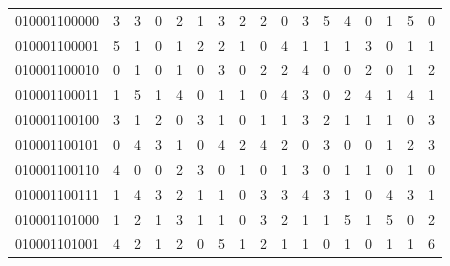 \documentclass[10pt,a4paper]{article}
\begin{document}
\begin{longtable}{ |c|c|c|c|c|c|c|c|c|c|c|c|c|c|c|c|c| }
    010001100000              & 3                            & 3                                & 0                            & 2                              & 1   & 3   & 2   & 2   & 0   & 3   & 5   & 4   & 0   & 1   & 5   & 0   \\
    010001100001              & 5                            & 1                                & 0                            & 1                              & 2   & 2   & 1   & 0   & 4   & 1   & 1   & 1   & 3   & 0   & 1   & 1   \\
    010001100010              & 0                            & 1                                & 0                            & 1                              & 0   & 3   & 0   & 2   & 2   & 4   & 0   & 0   & 2   & 0   & 1   & 2   \\
    010001100011              & 1                            & 5                                & 1                            & 4                              & 0   & 1   & 1   & 0   & 4   & 3   & 0   & 2   & 4   & 1   & 4   & 1   \\
    010001100100              & 3                            & 1                                & 2                            & 0                              & 3   & 1   & 0   & 1   & 1   & 3   & 2   & 1   & 1   & 1   & 0   & 3   \\
    010001100101              & 0                            & 4                                & 3                            & 1                              & 0   & 4   & 2   & 4   & 2   & 0   & 3   & 0   & 0   & 1   & 2   & 3   \\
    010001100110              & 4                            & 0                                & 0                            & 2                              & 3   & 0   & 1   & 0   & 1   & 3   & 0   & 1   & 1   & 0   & 1   & 0   \\
    010001100111              & 1                            & 4                                & 3                            & 2                              & 1   & 1   & 0   & 3   & 3   & 4   & 3   & 1   & 0   & 4   & 3   & 1   \\
    010001101000              & 1                            & 2                                & 1                            & 3                              & 1   & 1   & 0   & 3   & 2   & 1   & 1   & 5   & 1   & 5   & 0   & 2   \\
    010001101001              & 4                            & 2                                & 1                            & 2                              & 0   & 5   & 1   & 2   & 1   & 1   & 0   & 1   & 0   & 1   & 1   & 6   \\

\end{longtable}
\end{document}
